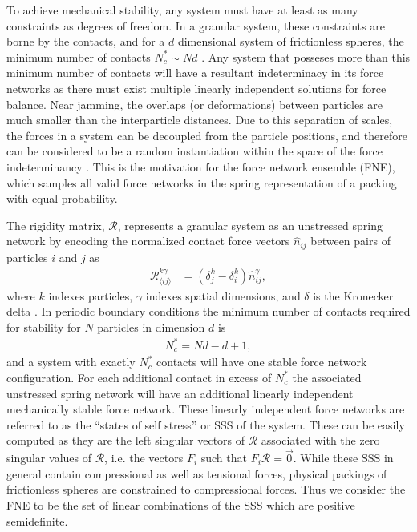 To achieve mechanical stability, any system must have at least as many constraints as degrees of freedom. In a granular system, these constraints are borne by the contacts, and for a $d$ dimensional system of frictionless spheres, the minimum number of contacts $N_c^* \sim Nd$ \cite{maxwell_calculation_1864}. Any system that posseses more than this minimum number of contacts will have a resultant indeterminacy in its force networks as there must exist multiple linearly independent solutions for force balance. Near jamming, the overlaps (or deformations) between particles are much smaller than the interparticle distances. Due to this separation of scales, the forces in a system can be decoupled from the particle positions, and therefore can be considered to be a random instantiation within the space of the force indeterminancy \cite{snoeijer_force_2004,tighe_force_2010,tighe_stress_2011,sartor_direct_2020}. This is the motivation for the force network ensemble (FNE), which samples all valid force networks in the spring representation of a packing with equal probability.



The rigidity matrix, $\mathcal{R}$, represents a granular system as an unstressed spring network by encoding the normalized contact force vectors $\hat n_{ij}$ between pairs of particles $i$ and $j$ as 
%
\begin{align}
 \mathcal{R}^{k\gamma}_{\langle ij \rangle} &= \left(\delta_{j}^k-\delta_{i}^k\right)\hat n^\gamma_{ij},
\end{align}
%
where $k$ indexes particles, $\gamma$ indexes spatial dimensions, and $\delta$ is the Kronecker delta \cite{ellenbroek_rigidity_2015,charbonneau_jamming_2015,f._hagh_broader_2019, sartor_direct_2020}. 
In periodic boundary conditions the minimum number of contacts required for stability for $N$ particles in dimension $d$ is \cite{goodrich_finite-size_2012}
%
\begin{align}
 N_c^* = Nd - d + 1,
\end{align}
%
 and a system with exactly $N_c^*$ contacts will have one stable force network configuration. For each additional contact in excess of $N_c^*$ the associated unstressed spring network will have an additional linearly independent mechanically stable force network. These linearly independent force networks are referred to as the ``states of self stress'' or SSS of the system. These can be easily computed as they are the left singular vectors of $\mathcal{R}$ associated with the zero singular values of $\mathcal{R}$, i.e. the vectors $F_i$ such that $F_i \mathcal{R}   = \vec{0}$. While these SSS in general contain compressional as well as tensional forces, physical packings of frictionless spheres are constrained to compressional forces. Thus we consider the FNE to be the set of linear combinations of the SSS which are positive semidefinite.



